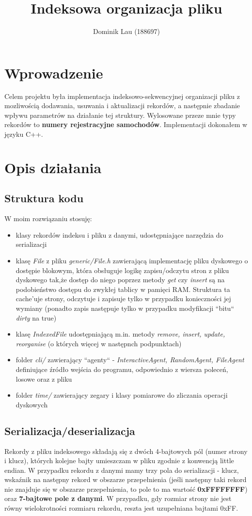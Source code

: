 \documentclass{article}
\title{Indeksowa organizacja pliku}
\author{Dominik Lau (188697)}
\begin{document}
\maketitle

\section{Wprowadzenie}
Celem projektu była implementacja indeksowo-sekwencyjnej organizacji pliku z mozliwością dodawania, usuwania i aktualizacji rekordów, a następnie zbadanie 
wpływu parametrów na działanie tej struktury.
Wylosowane przeze mnie typy rekordów to \textbf{numery rejestracyjne samochodów}. Implementacji
dokonałem w języku C++.
\section{Opis działania}
\subsection{Struktura kodu}
W moim rozwiązaniu stosuję:
\begin{itemize}
\item klasy rekordów indeksu i pliku z danymi, udostępniające narzędzia do serializacji
\item klasę \textit{File} z pliku \textit{generic/File.h} zawierającą implementację
pliku dyskowego o dostępie blokowym,  która obsługuje logikę zapisu/odczytu stron z pliku dyskowego tak,że
dostęp do niego poprzez metody \textit{get} czy \textit{insert} są na podobieństwo dostępu do zwykłej tablicy w pamięci RAM. Struktura ta cache'uje strony, odczytuje i zapisuje tylko w przypadku konieczności jej wymiany (ponadto zapis następuje tylko w przypadku modyfikacji ``bitu`` \textit{dirty} na true)
 \item klasę \textit{IndexedFile} udostępniającą m.in. metody \textit{remove, insert, update, reorganise} (o których więcej w następnch podpunktach)
 \item folder \textit{cli/} zawierający ``agenty`` - \textit{InteractiveAgent, RandomAgent, FileAgent} definiujące źródło wejścia do programu, odpowiednio z wiersza poleceń, losowe oraz z pliku
\item folder \textit{time/} zawierający zegary i klasy pomiarowe do zliczania operacji dyskowych
\end{itemize}
\subsection{Serializacja/deserializacja}
Rekordy z pliku indeksowego składają się z dwóch 4-bajtowych pól (numer strony i klucz), których kolejne bajty umieszczam w pliku zgodnie z konwencją little endian. W przypadku rekordu z danymi mamy trzy pola do serializacji - klucz, wskaźnik na następny rekord w obszarze przepełnienia (jeśli następny taki rekord nie znajduje
się w obszarze przepełnienia, to pole to ma wartość \textbf{0xFFFFFFFF}) oraz \textbf{7-bajtowe pole z danymi}.  W przypadku, gdy rozmiar strony nie jest równy wielokrotności rozmiaru rekordu, reszta jest uzupełniana bajtami 0xFF.
\end{document}
